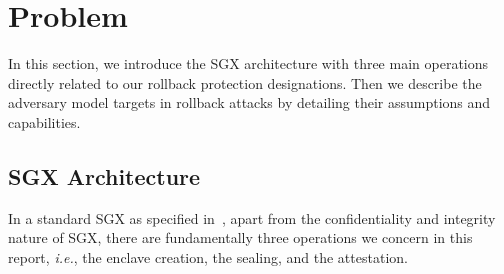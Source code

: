 \section{Problem}
\label{problem}
In this section, we introduce the SGX architecture with three main operations directly related to our rollback protection designations. Then we describe the adversary model targets in rollback attacks by detailing their assumptions and capabilities.

\subsection{SGX Architecture}
In a standard SGX as specified in~\cite{}, apart from the confidentiality and integrity nature of SGX, there are fundamentally three operations we concern in this report, \textit{i.e.}, the enclave creation, the sealing, and the attestation.
